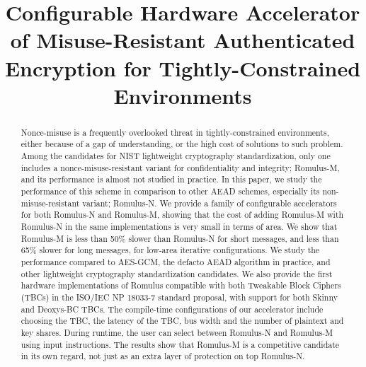 \documentclass[conference]{IEEEtran}
\begin{document}
\newcommand{\etal}{{\it et al.}\xspace}
\newcommand{\eg}{{\it e.g.}\xspace}

\title{Configurable Hardware Accelerator of Misuse-Resistant Authenticated Encryption for Tightly-Constrained Environments}
\author{
}

\maketitle

\begin{abstract}
Nonce-misuse is a frequently overlooked threat in tightly-constrained environments, either because of a gap of understanding, or the high cost of solutions to such problem. Among the candidates for NIST lightweight cryptography standardization, only one includes a nonce-misuse-resistant variant for confidentiality and integrity; Romulus-M, and its performance is almost not studied in practice. In this paper, we study the performance of this scheme in comparison to other AEAD schemes, especially its non-misuse-resistant variant; Romulus-N. We provide a family of configurable accelerators for both Romulus-N and Romulus-M, showing that the cost of adding Romulus-M with Romulus-N in the same implementations is very small in terms of area. We show that Romulus-M is less than 50\% slower than Romulus-N for short messages, and less than 65\% slower for long messages, for low-area iterative configurations. We study the performance compared to AES-GCM, the defacto AEAD algorithm in practice, and other lightweight cryptography standardization candidates. We also provide the first hardware implementations of Romulus compatible with both Tweakable Block Ciphers (TBCs) in the ISO/IEC NP 18033-7 standard proposal, with support for both Skinny and Deoxys-BC TBCs. The compile-time configurations of our accelerator include choosing the TBC, the latency of the TBC, bus width and the number of plaintext and key shares. During runtime, the user can select between Romulus-N and Romulus-M using input instructions. The results show that Romulus-M is a competitive candidate in its own regard, not just as an extra layer of protection on top Romulus-N.
\end{abstract}
\end{document}
